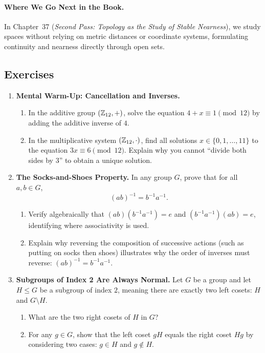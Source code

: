 \paragraph{Where We Go Next in the Book.}
In Chapter~37 (\emph{Second Pass: Topology as the Study of Stable Nearness}), we study spaces without relying on metric distances or coordinate systems, formulating continuity and nearness directly through open sets.

\subsection{Exercises}

\begin{enumerate}
  \item \textbf{Mental Warm-Up: Cancellation and Inverses.}
  \begin{enumerate}[label=(\alph*)]
    \item In the additive group $(\mathbb{Z}_{12}, +)$, solve the equation $4 + x \equiv 1 \pmod{12}$ by adding the additive inverse of $4$.
    \item In the multiplicative system $(\mathbb{Z}_{12}, \cdot)$, find all solutions $x \in \{0, 1, \dots, 11\}$ to the equation $3x \equiv 6 \pmod{12}$. Explain why you cannot ``divide both sides by $3$'' to obtain a unique solution.
  \end{enumerate}
  \item \textbf{The Socks-and-Shoes Property.} In any group $G$, prove that for all $a, b \in G$,
  \[
  (ab)^{-1} = b^{-1}a^{-1}.
  \]
  \begin{enumerate}[label=(\alph*)]
    \item Verify algebraically that $(ab)(b^{-1}a^{-1}) = e$ and $(b^{-1}a^{-1})(ab) = e$, identifying where associativity is used.
    \item Explain why reversing the composition of successive actions (such as putting on socks then shoes) illustrates why the order of inverses must reverse: $(ab)^{-1} = b^{-1}a^{-1}$.
  \end{enumerate}
  \item \textbf{Subgroups of Index 2 Are Always Normal.} Let $G$ be a group and let $H \le G$ be a subgroup of index $2$, meaning there are exactly two left cosets: $H$ and $G \setminus H$.
  \begin{enumerate}[label=(\alph*)]
    \item What are the two right cosets of $H$ in $G$?
    \item For any $g \in G$, show that the left coset $gH$ equals the right coset $Hg$ by considering two cases: $g \in H$ and $g \notin H$.

\end{enumerate}
\end{enumerate}

